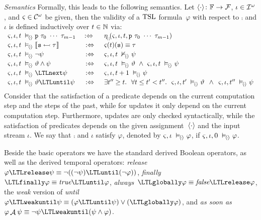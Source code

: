 \noindent \textit{Semantics} Formally, this leads to the following
semantics.  Let $ \langle \cdot \rangle \colon \mathbb{F} \rightarrow \mathcal{F} $,
\mbox{$ \iota \in \mathcal{I}^{\hspace{0.2pt}\omega} $}, and
$ \varsigma \in \mathcal{C}^{\omega} $ be given, then the validity of a $ \text{TSL}$
formula~$ \varphi $ with respect to $ \comp $ and $ \iota $ is defined inductively
over $ t \in \mathbb{N} $ via:
%
\begin{equation*}
  \begin{array}{lcl}
    \\[-1.8em]
    \comp, \iota, t \sats \name{p} \ \term_{0} \ \cdots \ \term_{m-1} & \ :\Leftrightarrow \ \
    & \eval(\comp,\iota,t,\name{p} \ \term_{0} \ \cdots \ \term_{m-1}) \\[0.2em]
    \comp, \iota, t \sats \upd{\name{s}}{\!\term} & :\Leftrightarrow
    & \comp(t)(\name{s}) \equiv \term \\[0.2em]
    \comp, \iota, t \sats \neg \psi & :\Leftrightarrow
    & \comp, \iota, t \nsats \psi \\[0.2em]
    \comp, \iota, t \sats \vartheta \wedge \psi & :\Leftrightarrow
    & \comp, \iota, t \sats \vartheta \ \wedge \ \comp, \iota, t \sats \psi \\[0.2em]
    \comp, \iota, t \sats \LTLnext \psi & :\Leftrightarrow
    & \comp, \iota, t+1 \sats \psi \\[0.2em]
    \comp, \iota, t \sats \vartheta \LTLuntil \psi & :\Leftrightarrow
    & \exists t'' \geq t. \ \
         \forall t \leq t' < t''. \ \ \comp, \iota, t' \sats \vartheta \ \,
         \wedge \ \, \comp, \iota, t'' \sats \psi
  \end{array}
\end{equation*}
%
Consider that the satisfaction of a predicate depends on the current
computation step and the steps of the past, while for updates it only
depend on the current computation step. Furthermore, updates are only
checked syntactically, while the satisfaction of predicates depends on
the given assignment~$ \langle \cdot \rangle $ and the input stream
$ \iota $.
%
We say that $ \comp $ and $ \iota $ satisfy $ \varphi $, denoted by
$ \varsigma, \iota \;\vDash_{\!\langle \hspace{-1pt} \cdot \hspace{-1pt} \rangle} \varphi$, if $ \varsigma, \iota, 0 \;\vDash_{\!\langle \hspace{-1pt} \cdot \hspace{-1pt} \rangle} \varphi
$.

Beside the basic operators we have the standard derived Boolean
operators, as well as the derived temporal operators:
\textit{release}~$ \varphi \LTLrelease \psi \equiv \neg ((\neg \psi)
\LTLuntil (\neg \varphi)) $,
\textit{finally}~$ \LTLfinally \varphi \equiv \emph{true} \LTLuntil
\varphi $,
\textit{always}~$ \LTLglobally \varphi \equiv \emph{false} \LTLrelease
\varphi $, the \textit{weak} version of \textit{until}
$ \varphi \LTLweakuntil \psi \equiv (\varphi \LTLuntil \psi) \vee
(\LTLglobally \varphi) $, and \textit{as soon
  as}~$ \varphi \mathop{\mathcal{A}}\hspace{0.5pt} \psi \equiv \neg
\psi \LTLweakuntil (\psi \wedge \varphi) $.

